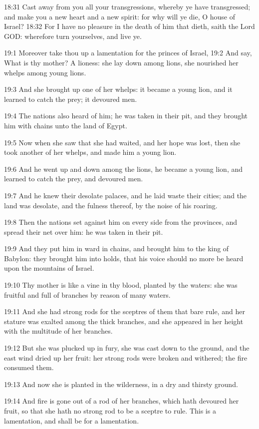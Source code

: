 18:31 Cast away from you all your transgressions, whereby ye have transgressed; and make you a new heart and a new spirit: for why will ye die, O house of Israel?  18:32 For I have no pleasure in the death of him that dieth, saith the Lord GOD: wherefore turn yourselves, and live ye.

19:1 Moreover take thou up a lamentation for the princes of Israel, 19:2 And say, What is thy mother? A lioness: she lay down among lions, she nourished her whelps among young lions.

19:3 And she brought up one of her whelps: it became a young lion, and it learned to catch the prey; it devoured men.

19:4 The nations also heard of him; he was taken in their pit, and they brought him with chains unto the land of Egypt.

19:5 Now when she saw that she had waited, and her hope was lost, then she took another of her whelps, and made him a young lion.

19:6 And he went up and down among the lions, he became a young lion, and learned to catch the prey, and devoured men.

19:7 And he knew their desolate palaces, and he laid waste their cities; and the land was desolate, and the fulness thereof, by the noise of his roaring.

19:8 Then the nations set against him on every side from the provinces, and spread their net over him: he was taken in their pit.

19:9 And they put him in ward in chains, and brought him to the king of Babylon: they brought him into holds, that his voice should no more be heard upon the mountains of Israel.

19:10 Thy mother is like a vine in thy blood, planted by the waters: she was fruitful and full of branches by reason of many waters.

19:11 And she had strong rods for the sceptres of them that bare rule, and her stature was exalted among the thick branches, and she appeared in her height with the multitude of her branches.

19:12 But she was plucked up in fury, she was cast down to the ground, and the east wind dried up her fruit: her strong rods were broken and withered; the fire consumed them.

19:13 And now she is planted in the wilderness, in a dry and thirsty ground.

19:14 And fire is gone out of a rod of her branches, which hath devoured her fruit, so that she hath no strong rod to be a sceptre to rule. This is a lamentation, and shall be for a lamentation.

